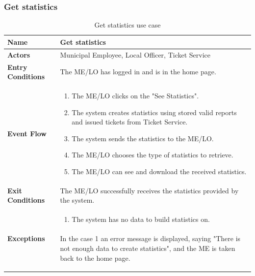					\subsubsection{Get statistics}
					\begin{table}[!h]
						\centering
						\vspace{-4mm}
						\begin{tabular}{lp{}}
							\toprule
							\textbf{Name} & \textbf{Get statistics} \\[1mm]
							\midrule
							\textbf{Actors} & Municipal Employee, Local Officer, Ticket Service \\[1mm]
							\textbf{Entry Conditions} & The ME/LO has logged in and is in the home page. \vspace{1mm}\\
							\textbf{Event Flow} &
							\vspace{-5mm} 
							\begin{enumerate}
								\setlength\itemsep{0.1mm}
								\item The ME/LO clicks on the "See Statistics".
								\item The system creates statistics using stored valid reports and issued tickets from Ticket Service.
								\item The system sends the statistics to the ME/LO.
								\item The ME/LO chooses the type of statistics to retrieve.
								\item The ME/LO can see and download the received statistics.
							\end{enumerate} \\
							\textbf{Exit Conditions} & The ME/LO successfully receives the statistics provided by the system. \vspace{1mm}\\
							\textbf{Exceptions} & 
								\vspace{-5mm} 
								\begin{enumerate}
									\item The system has no data to build statistics on.
								\end{enumerate}
								\vspace{-7mm}
								\paragraph{}
									In the case 1 an error message is displayed, saying "There is not enough data to create statistics", and the ME is taken back to the home page.\\
							\bottomrule
						\end{tabular}
						\caption{Get statistics use case}
					\end{table}
					

